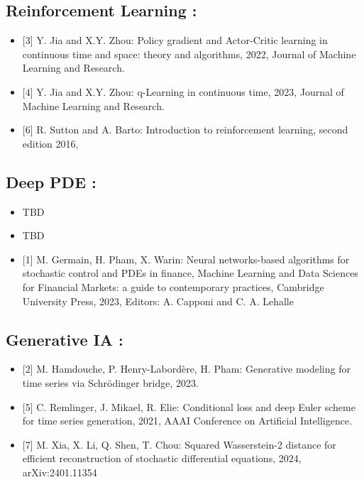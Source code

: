 \documentclass[
  10,
  letterpaper,
  DIV=11,
  numbers=noendperiod]{scrreport}
\newlength{\cslhangindent}
\newenvironment{CSLReferences}[2] %
 {\begin{list}{}{%
  \setlength{\itemindent}{0pt}
  \setlength{\leftmargin}{0pt}
  \setlength{\parsep}{0pt}
  \ifodd #1
   \setlength{\leftmargin}{\cslhangindent}
   \setlength{\itemindent}{-1\cslhangindent}
  \fi
  \setlength{\itemsep}{#2\baselineskip}}}
 {\end{list}}
\theoremstyle{plain}
\theoremstyle{definition}
\theoremstyle{definition}
\theoremstyle{remark}
\begin{document}

\label{refs}
\begin{CSLReferences}{0}{1}
\end{CSLReferences}

\subsection*{Reinforcement Learning :}\label{reinforcement-learning}

\begin{itemize}
\item
  {[}3{]} Y. Jia and X.Y. Zhou: Policy gradient and Actor-Critic
  learning in continuous time and space: theory and algorithms, 2022,
  Journal of Machine Learning and Research.
\item
  {[}4{]} Y. Jia and X.Y. Zhou: q-Learning in continuous time, 2023,
  Journal of Machine Learning and Research.
\item
  {[}6{]} R. Sutton and A. Barto: Introduction to reinforcement
  learning, second edition 2016,
\end{itemize}

\subsection*{Deep PDE :}\label{deep-pde}

\begin{itemize}
\item
  TBD
\item
  TBD
\item
  {[}1{]} M. Germain, H. Pham, X. Warin: Neural networks-based
  algorithms for stochastic control and PDEs in finance, Machine
  Learning and Data Sciences for Financial Markets: a guide to
  contemporary practices, Cambridge University Press, 2023, Editors: A.
  Capponi and C. A. Lehalle
\end{itemize}

\subsection*{Generative IA :}\label{generative-ia}

\begin{itemize}
\item
  {[}2{]} M. Hamdouche, P. Henry-Labordère, H. Pham: Generative modeling
  for time series via Schrödinger bridge, 2023.
\item
  {[}5{]} C. Remlinger, J. Mikael, R. Elie: Conditional loss and deep
  Euler scheme for time series generation, 2021, AAAI Conference on
  Artificial Intelligence.
\item
  {[}7{]} M. Xia, X. Li, Q. Shen, T. Chou: Squared Wasserstein-2
  distance for efficient reconstruction of stochastic differential
  equations, 2024, arXiv:2401.11354
\end{itemize}
\end{document}
